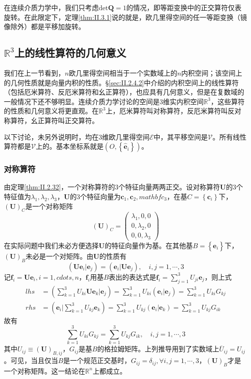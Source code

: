 \documentclass[main.tex]{subfiles}
\begin{document}
在连续介质力学中，我们只考虑$\mathrm{det}\mathbf{Q}=1$的情况，即等距变换中的正交算符仅表旋转。在此限定下，定理\ref{thm:II.3.1}说的就是，欧几里得空间的任一等距变换（镜像除外）都是平移加旋转。


\subsection{$\mathbb{R}^3$上的线性算符的几何意义}
我们在上一节看到，$n$欧几里得空间相当于一个实数域上的$n$内积空间；该空间上的几何性质就是向量内积的性质。\S\ref{sec:II.2.4.2}中介绍的内积空间上的线性算符（包括厄米算符、反厄米算符和幺正算符），也应具有几何意义，但是在复数域的一般情况下还不够明显。连续介质力学讨论的空间是3维实内积空间$\mathbb{R}^3$，这些算符的性质和几何意义将更直观。在$\mathbb{R}^3$上，厄米算符叫对称算符，反厄米算符叫反对称算符，幺正算符叫正交算符。

以下讨论，未另外说明时，均在3维欧几里得空间$\mathcal{E}$中，其平移空间是$\mathcal{V}$。所有线性算符都是$\mathcal{V}$上的。基本坐标系就是$\left(O,\left\{\mathbf{\hat{e}}_i\right\}\right)$。

\subsubsection{对称算符}
由定理\ref{thm:II.2.32}，一个对称算符的3个特征向量两两正交。设对称算符$\mathbf{U}$的3个特征值为$\lambda_1,\lambda_2,\lambda_3$，$\mathbf{U}$的3个特征向量为$\mathbf{c}_1,\mathbf{c}_2,mathbf{c}_3$，在基$C=\left\{\mathbf{c}_i\right\}$下，$\left(\mathbf{U}\right)_C$是一个对称矩阵
\[
    \left(\mathbf{U}\right)_C=\left(\begin{array}{ccc}\lambda_1,0,0\\0,\lambda_2,0\\0,0,\lambda_3\end{array}\right)
\]
在实际问题中我们未必方便选择$\mathbf{U}$的特征向量作为基。在其他基$B=\left\{\mathbf{\hat{e}}_i\right\}$下，$\left(\mathbf{U}\right)_B$未必是一个对矩阵。由$\mathbf{U}$的性质有
\[
    \left(\mathbf{Ue}_i|\mathbf{e}_j\right)=\left(\mathbf{e}_i|\mathbf{Ue}_j\right),\quad i,j=1,\cdots,3
\]
记$\mathbf{f}_i=\mathbf{Ue}_i,i=1,cdots,n$，$\mathbf{f}_i$用基$B$表出的表达式是$\mathbf{f}_i=\sum_{j=1}^3 U_{ji}\mathbf{e}_j$，则上式
\begin{align*}
    lhs & =\left(\sum_{k=1}^3U_{ki}\mathbf{Ue}_k|\mathbf{e}_j\right)=\sum_{k=1}^3U_{ki}\left(\mathbf{e}_i|\mathbf{e}_j\right)=\sum_{k=1}^3U_{ki}G_{kj} \\
    rhs & =\left(\mathbf{e}_i|\sum_{k=1}^3U_{kj}\mathbf{e}_k\right)=\sum_{k=1}^3U_{kj}\left(\mathbf{e}_i|\mathbf{e}_k\right)=\sum_{k=1}^3U_{kj}G_{ik}
\end{align*}
故有
\[\sum_{k=1}^3U_{ki}G_{kj}=\sum_{k=1}^3U_{kj}G_{ik},\quad i,j=1,\cdots,3\]
其中$U_{ij}\equiv\left(\mathbf{U}\right)_{B,ij}$，$G_{ij}$是基$B$的格拉姆矩阵。上列推导用到了实数域上$\overline{U}_{ij}=U_{ij}$。可见，当且仅当$B$是一个规范正交基时，$G_{ij}=\delta_{ij},\forall i,j=1,\cdots,3$，$\left(\mathbf{U}\right)_B$才是一个对称矩阵。这一结论在$\mathbb{R}^n$上都成立。
\end{document}
